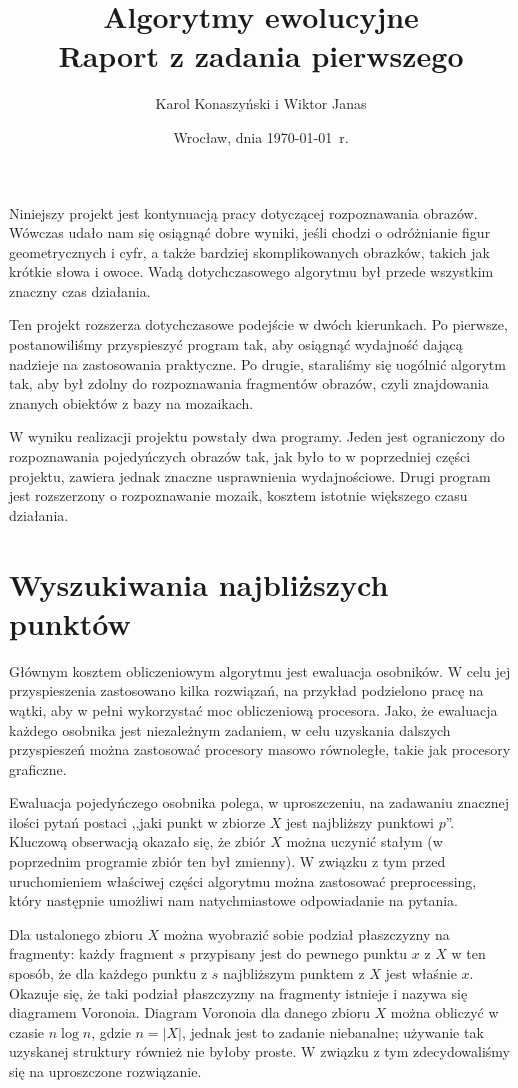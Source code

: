 \documentclass[a4paper,12pt,leqno]{article}
\title{\textbf{Algorytmy ewolucyjne}\\
       {\Large Raport z zadania pierwszego}\\[-1ex]}
\author{Karol Konaszyński i Wiktor Janas}
\date{Wrocław, dnia \today\ r.}
\begin{document}
\maketitle

Niniejszy projekt jest kontynuacją pracy dotyczącej rozpoznawania obrazów. Wówczas udało nam się osiągnąć dobre wyniki, jeśli chodzi o odróżnianie figur geometrycznych i cyfr, a także bardziej
skomplikowanych obrazków, takich jak krótkie słowa i owoce. Wadą dotychczasowego algorytmu był przede wszystkim znaczny czas działania.

Ten projekt rozszerza dotychczasowe podejście w dwóch kierunkach. Po pierwsze, postanowiliśmy przyspieszyć program tak, aby osiągnąć wydajność dającą nadzieje na zastosowania praktyczne.
Po drugie, staraliśmy się uogólnić algorytm tak, aby był zdolny do rozpoznawania fragmentów obrazów, czyli znajdowania znanych obiektów z bazy na mozaikach.

W wyniku realizacji projektu powstały dwa programy. Jeden jest ograniczony do rozpoznawania pojedyńczych obrazów tak, jak było to w poprzedniej części projektu, zawiera jednak znaczne
usprawnienia wydajnościowe. Drugi program jest rozszerzony o rozpoznawanie mozaik, kosztem istotnie większego czasu działania.

\section{Wyszukiwania najbliższych punktów}

Głównym kosztem obliczeniowym algorytmu jest ewaluacja osobników. W celu jej przyspieszenia zastosowano kilka rozwiązań, na przykład podzielono pracę na wątki, aby w pełni wykorzystać 
moc obliczeniową procesora. Jako, że ewaluacja każdego osobnika jest niezależnym zadaniem, w celu uzyskania dalszych przyspieszeń można zastosować procesory masowo równoległe, takie
jak procesory graficzne. 

Ewaluacja pojedyńczego osobnika polega, w uproszczeniu, na zadawaniu znacznej ilości pytań postaci ,,jaki punkt w zbiorze $X$ jest najbliższy punktowi $p$''. Kluczową obserwacją okazało
się, że zbiór $X$ można uczynić stałym (w poprzednim programie zbiór ten był zmienny). W związku z tym przed uruchomieniem właściwej części algorytmu można zastosować preprocessing,
który następnie umożliwi nam natychmiastowe odpowiadanie na pytania. 

Dla ustalonego zbioru $X$ można wyobrazić sobie podział płaszczyzny na fragmenty: każdy fragment $s$ przypisany jest do pewnego punktu $x$ z $X$ w ten sposób, że dla każdego punktu
z $s$ najbliższym punktem z $X$ jest właśnie $x$. Okazuje się, że taki podział płaszczyzny na fragmenty istnieje i nazywa się diagramem Voronoia. Diagram Voronoia dla danego zbioru
$X$ można obliczyć w czasie $n \log n$, gdzie $n = |X|$, jednak jest to zadanie niebanalne; używanie tak uzyskanej struktury również nie byłoby proste. W związku z tym zdecydowaliśmy
się na uproszczone rozwiązanie.
\end{document}
